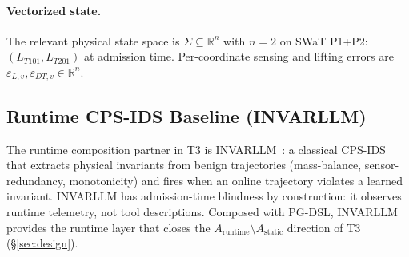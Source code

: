\paragraph{Vectorized state.}
The relevant physical state space is $\Sigma \subseteq \mathbb{R}^n$
with $n=2$ on SWaT P1+P2: $(L_{T101}, L_{T201})$ at admission time.
Per-coordinate sensing and lifting errors are
$\varepsilon_{L,v}, \varepsilon_{DT,v} \in \mathbb{R}^n$.

\subsection{Runtime CPS-IDS Baseline (INVARLLM)}

The runtime composition partner in T3 is INVARLLM~\cite{invarllm}: a
classical CPS-IDS that extracts physical invariants from benign
trajectories (mass-balance, sensor-redundancy, monotonicity) and
fires when an online trajectory violates a learned invariant.
INVARLLM has admission-time blindness by construction: it observes
runtime telemetry, not tool descriptions. Composed with PG-DSL,
INVARLLM provides the runtime layer that closes the
$A_{\text{runtime}} \setminus A_{\text{static}}$ direction of T3
(\S\ref{sec:design}).

